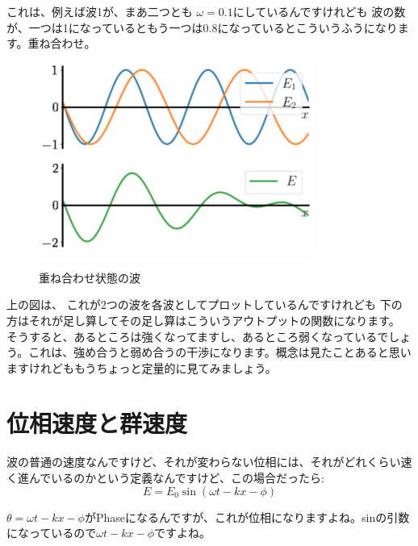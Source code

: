 これは、例えば波1が、まあ二つとも $\omega = 0.1$にしているんですけれども
波の数が、一つは1になっているともう一つは0.8になっているとこういうふうになります。重ね合わせ。
\begin{figure}[H]
   \centering
    \includegraphics[width=0.8\textwidth]{lesson6/wave_superposition.pdf}
    \label{fig: 1}
    \begin{center}
        \caption{重ね合わせ状態の波}
    \end{center}
\end{figure}

上の図は、 これが2つの波を各波としてプロットしているんですけれども
下の方はそれが足し算してその足し算はこういうアウトプットの関数になります。
そうすると、あるところは強くなってますし、あるところ弱くなっているでしょう。これは、強め合うと弱め合うの干渉になります。概念は見たことあると思いますけれどももうちょっと定量的に見てみましょう。



\section{位相速度と群速度}
波の普通の速度なんですけど、それが変わらない位相には、それがどれくらい速く進んでいるのかという定義なんですけど、この場合だったら:
\begin{equation}
E=E_{0} \sin (\omega t-k x-\phi)
\end{equation}


$\theta=\omega t-k x-\phi$がPhaseになるんですが、これが位相になりますよね。sinの引数になっているので$\omega t - k x - \phi$ですよね。

